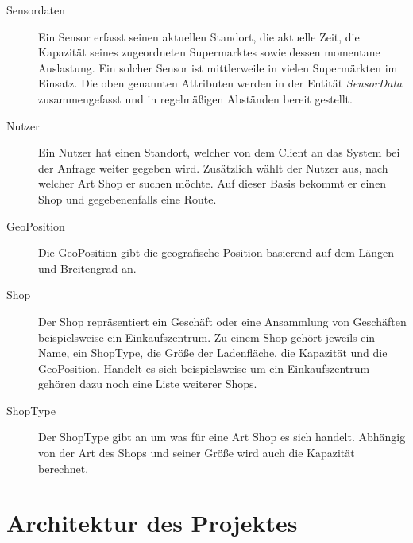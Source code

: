 \documentclass[runningheads]{llncs}
\begin{document}
\begin{description}
	\item[Sensordaten] Ein Sensor erfasst seinen aktuellen Standort, die aktuelle Zeit, die Kapazität seines zugeordneten Supermarktes sowie dessen momentane Auslastung. Ein solcher Sensor ist mittlerweile in vielen Supermärkten im Einsatz. Die oben genannten Attributen werden in der Entität \textit{SensorData} zusammengefasst und in regelmäßigen Abständen bereit gestellt.
	\item[Nutzer] Ein Nutzer hat einen Standort, welcher von dem Client an das System bei der Anfrage weiter gegeben wird. Zusätzlich wählt der Nutzer aus, nach welcher Art Shop er suchen möchte. Auf dieser Basis bekommt er einen Shop und gegebenenfalls eine Route.
	\item[GeoPosition] Die GeoPosition gibt die geografische Position basierend auf dem Längen- und Breitengrad an.
	\item[Shop] Der Shop repräsentiert ein Geschäft oder eine Ansammlung von Geschäften beispielsweise ein Einkaufszentrum. Zu einem Shop gehört jeweils ein Name, ein ShopType, die Größe der Ladenfläche, die Kapazität und die GeoPosition. Handelt es sich beispielsweise um ein Einkaufszentrum gehören dazu noch eine Liste weiterer Shops.
	\item[ShopType] Der ShopType gibt an um was für eine Art Shop es sich handelt.
Abhängig von der Art des Shops und seiner Größe wird auch die Kapazität berechnet.
	
\end{description}


\section{Architektur des Projektes}
\end{document}
